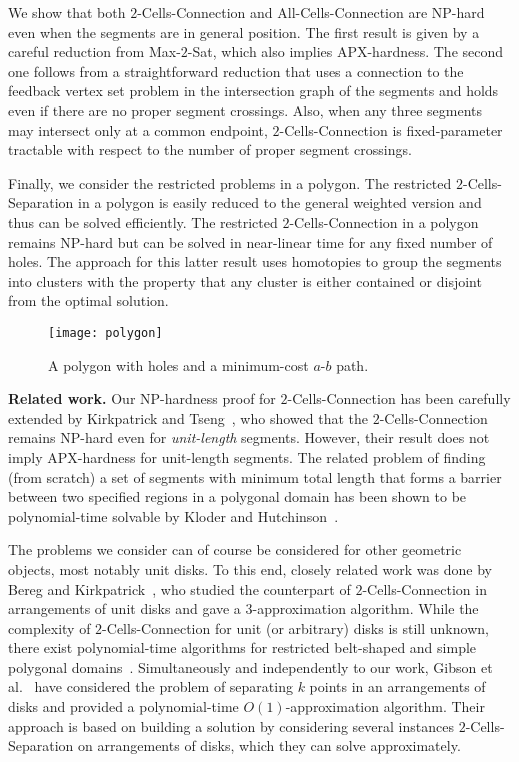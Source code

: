 \documentclass[11pt,a4paper]{article}
\begin{document}
We show that both {\sc $2$-Cells-Connection} and {\sc All-Cells-Connection} are NP-hard even when the segments are in general position. The first result is given by a careful reduction from {\sc Max-$2$-Sat}, which also implies APX-hardness. The second one follows from a straightforward reduction that uses a connection to the feedback vertex set problem in the intersection graph of the segments and holds even if there are no proper segment crossings. Also, when any three segments may intersect only at a common endpoint, {\sc $2$-Cells-Connection} is fixed-parameter tractable with respect to the number of proper segment crossings. 

Finally, we consider the restricted problems in a polygon. The restricted {\sc $2$-Cells-Separation} in a polygon is easily reduced to the general weighted version and thus can be solved efficiently. The restricted {\sc $2$-Cells-Connection} in a polygon remains NP-hard but can be solved in near-linear time for any fixed number of holes. The approach for this latter result uses homotopies to group the segments into clusters with the property that any cluster is either contained or disjoint from the optimal solution. 

\begin{figure}[t]
\centering
\texttt{[image: polygon]}
\caption{A polygon with holes and a minimum-cost $a$-$b$ path.}
\label{fig:polygon}
\end{figure}

\medskip
\noindent
{\bf Related work.} Our NP-hardness proof for {\sc $2$-Cells-Connection} has been carefully extended by Kirkpatrick and Tseng~\cite{tseng-thesis}, who showed that the {\sc $2$-Cells-Connection} remains NP-hard even for \emph{unit-length} segments. However, their result does not imply APX-hardness for unit-length segments. 
The related problem of finding (from scratch) a set of segments with minimum total length that forms a barrier between two specified regions in a polygonal domain has been shown to be polynomial-time solvable by Kloder and Hutchinson~\cite{KH07}.

The problems we consider can of course be considered for other geometric objects, most notably unit disks. To this end, closely related work was done by Bereg and Kirkpatrick~\cite{BK09}, who studied the counterpart of {\sc $2$-Cells-Connection} in arrangements of unit disks and gave a $3$-approximation algorithm.  While the complexity of {\sc $2$-Cells-Connection} for unit (or arbitrary) disks is still unknown, there exist polynomial-time algorithms for restricted belt-shaped and simple polygonal domains~\cite{KLA07}. Simultaneously and independently to our work, Gibson et al.~\cite{gkv-ipud-11} have considered the problem of separating $k$ points in an arrangements of disks and provided a polynomial-time $O(1)$-approximation algorithm. Their approach is based on building a solution by considering several instances {\sc $2$-Cells-Separation} on arrangements of disks, which they can solve approximately.
\end{document}
